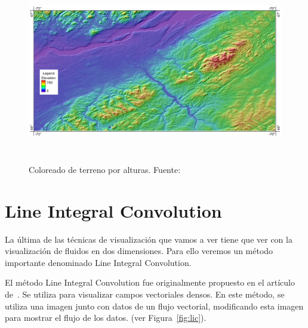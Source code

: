 \begin{figure}[h!]
	\centering	
	\includegraphics[height=8cm]{figures/terraincoloring.jpg}
	\caption[Coloreado de terreno por alturas.]{Coloreado de terreno por
	alturas. Fuente:~\cite{terraincoloringimage}}
	\label{fig:terrain}
\end{figure}

\section{Line Integral Convolution}
\label{ref:lic}

La última de las técnicas de visualización que vamos a ver tiene que ver con la
visualización de fluidos en dos dimensiones. Para ello veremos un método
importante denominado Line Integral Convolution.

El método Line Integral Convolution fue originalmente propuesto en el artículo
de~\citet{osti_10185520}. Se utiliza para visualizar campos vectoriales densos.
En este método, se utiliza una imagen junto con datos de un flujo vectorial,
modificando esta imagen para mostrar el flujo de los datos. (ver
Figura~\ref{fig:lic}). 

